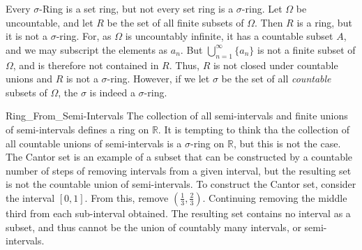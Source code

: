                 \begin{example}
                    Every $\sigma$-Ring is a set ring, but not every
                    set ring is a $\sigma$-ring. Let $\Omega$ be
                    uncountable, and let $R$ be the set of all finite
                    subsets of $\Omega$. Then $R$ is a ring, but it is
                    not a $\sigma$-ring. For, as $\Omega$ is uncountably
                    infinite, it has a countable subset $A$, and we
                    may subscript the elements as $a_{n}$. But
                    $\bigcup_{n=1}^{\infty}\{a_{n}\}$ is not a finite
                    subset of $\Omega$, and is therefore not contained
                    in $R$. Thus, $R$ is not closed under countable unions
                    and $R$ is not a $\sigma$-ring. However, if we let
                    $\sigma$ be the set of all \textit{countable} subsets
                    of $\Omega$, the $\sigma$ is indeed a $\sigma$-ring.
                \end{example}
                \begin{lexample}{}{Ring_From_Semi-Intervals}
                    The collection of all semi-intervals and finite
                    unions of semi-intervals defines a ring on
                    $\mathbb{R}$. It is tempting to think tha the
                    collection of all countable unions of semi-intervals
                    is a $\sigma$-ring on $\mathbb{R}$, but this is not
                    the case. The Cantor set is an example of a subset
                    that can be constructed by a countable number of
                    steps of removing intervals from a given interval,
                    but the resulting set is not the countable union of
                    semi-intervals. To construct the Cantor set, consider
                    the interval $[0,1]$. From this, remove
                    $(\frac{1}{3},\frac{2}{3})$. Continuing removing the
                    middle third from each sub-interval obtained. The
                    resulting set contains no interval as a subset, and
                    thus cannot be the union of countably many intervals,
                    or semi-intervals.
                \end{lexample}

